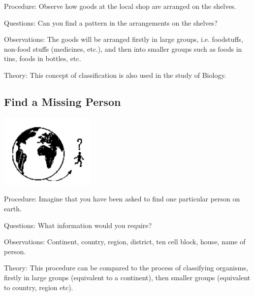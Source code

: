 \begin{multicols}{2}
\begin{description*}
\item[Procedure:]{Observe how goods at the local shop are arranged on the shelves.}
\item[Questions:]{Can you find a pattern in the arrangements on the shelves?}
\item[Observations:]{The goods will be arranged firstly in large groups, i.e. foodstuffs, non-food stuffs (medicines,
etc.), and then into smaller groups such as foods in tins, foods in bottles, etc.}
\item[Theory:]{This concept of classification is also used in the study of Biology.}
\end{description*}

\subsection{Find a Missing Person}

\begin{center}
\includegraphics[width=0.35\textwidth]{./img/source/missing-person.png}
\end{center}

\begin{description*}
\item[Procedure:]{Imagine that you have been asked to find one particular person on earth.}
\item[Questions:]{What information would you require?}
\item[Observations:]{Continent, country, region, district, ten cell block, house, name of person.}
\item[Theory:]{This procedure can be compared to the process of classifying organisms, firstly in large
groups (equivalent to a continent), then smaller groups (equivalent to country, region etc).}
\end{description*}


\end{multicols}
